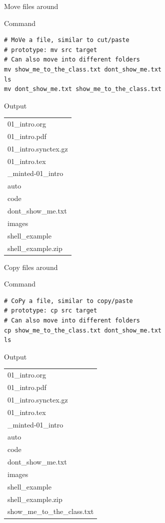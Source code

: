 \documentclass[presentation]{beamer}
\begin{document}
\begin{frame}[label={sec:org1744637},fragile]{Move files around}
 \begin{block}{Command}
\begin{verbatim}
# MoVe a file, similar to cut/paste
# prototype: mv src target
# Can also move into different folders
mv show_me_to_the_class.txt dont_show_me.txt
ls
mv dont_show_me.txt show_me_to_the_class.txt
\end{verbatim}
\end{block}

\alert{Output}
\tiny
\begin{center}
\begin{tabular}{l}
\toprule
01\_intro.org\\
01\_intro.pdf\\
01\_intro.synctex.gz\\
01\_intro.tex\\
\_minted-01\_intro\\
auto\\
code\\
dont\_show\_me.txt\\
images\\
shell\_example\\
shell\_example.zip\\
\bottomrule
\end{tabular}
\end{center}
\end{frame}

\begin{frame}[label={sec:orgf9ed68e},fragile]{Copy files around}
 \begin{block}{Command}
\begin{verbatim}
# CoPy a file, similar to copy/paste
# prototype: cp src target
# Can also move into different folders
cp show_me_to_the_class.txt dont_show_me.txt
ls
\end{verbatim}
\end{block}

\alert{Output}
\tiny
\begin{center}
\begin{tabular}{l}
\toprule
01\_intro.org\\
01\_intro.pdf\\
01\_intro.synctex.gz\\
01\_intro.tex\\
\_minted-01\_intro\\
auto\\
code\\
dont\_show\_me.txt\\
images\\
shell\_example\\
shell\_example.zip\\
show\_me\_to\_the\_class.txt\\
\bottomrule
\end{tabular}
\end{center}
\end{frame}
\end{document}
